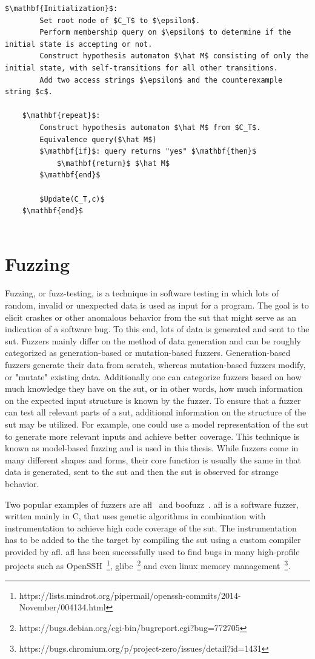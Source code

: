 \begin{lstlisting}[mathescape=true, float=ht, caption=$KV$ algorithm, label=lst:kv]
	$\mathbf{Initialization}$: 
		Set root node of $C_T$ to $\epsilon$. 
		Perform membership query on $\epsilon$ to determine if the initial state is accepting or not.
		Construct hypothesis automaton $\hat M$ consisting of only the initial state, with self-transitions for all other transitions.
		Add two access strings $\epsilon$ and the counterexample string $c$.
	
	$\mathbf{repeat}$:
		Construct hypothesis automaton $\hat M$ from $C_T$.
		Equivalence query($\hat M$)
		$\mathbf{if}$: query returns "yes" $\mathbf{then}$
			$\mathbf{return}$ $\hat M$
		$\mathbf{end}$
		
		$Update(C_T,c)$
	$\mathbf{end}$
	
\end{lstlisting}


\section{Fuzzing}
Fuzzing, or fuzz-testing, is a technique in software testing in which lots of random, invalid or unexpected data is used as input for a program. The goal is to elicit crashes or other anomalous behavior from the \ac{sut} that might serve as an indication of a software bug. To this end, lots of data is generated and sent to the \ac{sut}. Fuzzers mainly differ on the method of data generation and can be roughly categorized as generation-based or mutation-based fuzzers. Generation-based fuzzers generate their data from scratch, whereas mutation-based fuzzers modify, or "mutate" existing data. Additionally one can categorize fuzzers based on how much knowledge they have on the \ac{sut}, or in other words, how much information on the expected input structure is known by the fuzzer. To ensure that a fuzzer can test all relevant parts of a \ac{sut}, additional information on the structure of the \ac{sut} may be utilized. For example, one could use a model representation of the \ac{sut} to generate more relevant inputs and achieve better coverage. This technique is known as model-based fuzzing and is used in this thesis. While fuzzers come in many different shapes and forms, their core function is usually the same in that data is generated, sent to the \Ac{sut} and then the \ac{sut} is observed for strange behavior.

Two popular examples of fuzzers are \ac{afl}~\parencite{zalewskiafl} and boofuzz~\parencite{pereyda2019boofuzz}. \ac{afl} is a software fuzzer, written mainly in C, that uses genetic algorithms in combination with instrumentation to achieve high code coverage of the \Ac{sut}. The instrumentation has to be added to the the target by compiling the \ac{sut} using a custom compiler provided by \ac{afl}. \ac{afl} has been successfully used to find bugs in many high-profile projects such as OpenSSH~\footnote{https://lists.mindrot.org/pipermail/openssh-commits/2014-November/004134.html}, glibc~\footnote{https://bugs.debian.org/cgi-bin/bugreport.cgi?bug=772705} and even linux memory management~\footnote{https://bugs.chromium.org/p/project-zero/issues/detail?id=1431}. 

